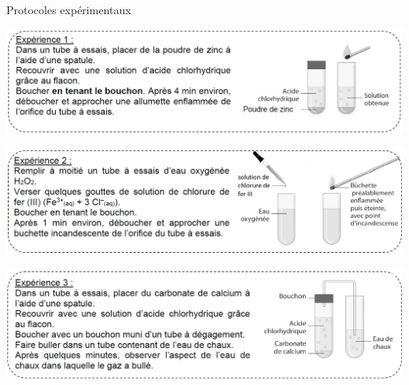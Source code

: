 \begin{doc}{Protocoles expérimentaux}
\begin{minipage}{\linewidth}
\begin{center}
    \includegraphics[scale=0.46]{Images/Exp_H2.png}
\end{center}
\end{minipage}
\begin{minipage}{\linewidth}
\begin{center}
    \includegraphics[scale=0.46]{Images/Exp_O2.png}
\end{center}
\end{minipage}
\begin{minipage}{\linewidth}
\begin{center}
    \includegraphics[scale=0.46]{Images/Exp_CO2.png}
\end{center}
\end{minipage}
\end{doc}

